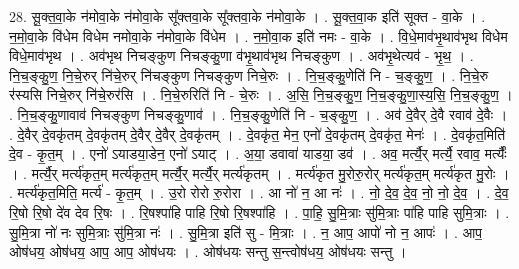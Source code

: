 \documentclass[17pt]{extarticle}
\begin{document}
28. सू॒क्त॒वा॒के न॑मोवा॒के न॑मोवा॒के सू᳚क्तवा॒के सू᳚क्तवा॒के न॑मोवा॒के । . सू॒क्त॒वा॒क इति॑ सूक्त - वा॒के । . न॒मो॒वा॒के वि॑धेम विधेम नमोवा॒के न॑मोवा॒के वि॑धेम । . न॒मो॒वा॒क इति॑ नमः - वा॒के । . वि॒धे॒माव॑भृ॒थाव॑भृथ विधेम विधे॒माव॑भृथ । . अव॑भृथ निचङ्कुण निचङ्कु॒णा व॑भृ॒थाव॑भृथ निचङ्कुण । . अव॑भृ॒थेत्यव॑ - भृ॒थ॒ । . नि॒च॒ङ्कु॒ण॒ नि॒चे॒रुर् नि॑चे॒रुर् नि॑चङ्कुण निचङ्कुण निचे॒रुः । . नि॒च॒ङ्कु॒णेति॑ नि - च॒ङ्कु॒ण॒ । . नि॒चे॒रु र॑स्यसि निचे॒रुर् नि॑चे॒रुर॑सि । . नि॒चे॒रुरिति॑ नि - चे॒रुः । . अ॒सि॒ नि॒च॒ङ्कु॒ण॒ नि॒च॒ङ्कु॒णा॒स्य॒सि॒ नि॒च॒ङ्कु॒ण॒ । . नि॒च॒ङ्कु॒णावाव॑ निचङ्कुण निचङ्कु॒णाव॑ । . नि॒च॒ङ्कु॒णेति॑ नि - च॒ङ्कु॒ण॒ । . अव॑ दे॒वैर् दे॒वै रवाव॑ दे॒वैः । . दे॒वैर् दे॒वकृ॑तम् दे॒वकृ॑तम् दे॒वैर् दे॒वैर् दे॒वकृ॑तम् । . दे॒वकृ॑त॒ मेन॒ एनो॑ दे॒वकृ॑तम् दे॒वकृ॑त॒ मेनः॑ । . दे॒वकृ॑त॒मिति॑ दे॒व - कृ॒त॒म् । . एनो॑ ऽयाडया॒डेन॒ एनो॑ ऽयाट् । . अ॒या॒ डवावा॑ याडया॒ डव॑ । . अव॒ मर्त्यै॒र् मर्त्यै॒ रवाव॒ मर्त्यैः᳚ । . मर्त्यै॒र् मर्त्य॑कृत॒म् मर्त्य॑कृत॒म् मर्त्यै॒र् मर्त्यै॒र् मर्त्य॑कृतम् । . मर्त्य॑कृत मु॒रोरु॒रोर् मर्त्य॑कृत॒म् मर्त्य॑कृत मु॒रोः । . मर्त्य॑कृत॒मिति॒ मर्त्य॑ - कृ॒त॒म् । . उ॒रो रोरो रु॒रोरा । . आ नो॑ न॒ आ नः॑ । . नो॒ दे॒व॒ दे॒व॒ नो॒ नो॒ दे॒व॒ । . दे॒व॒ रि॒षो रि॒षो दे॑व देव रि॒षः । . रि॒षश्पा॑हि पाहि रि॒षो रि॒षश्पा॑हि । . पा॒हि॒ सु॒मि॒त्राः सु॑मि॒त्राः पा॑हि पाहि सुमि॒त्राः । . सु॒मि॒त्रा नो॑ नः सुमि॒त्राः सु॑मि॒त्रा नः॑ । . सु॒मि॒त्रा इति॑ सु - मि॒त्राः । . न॒ आप॒ आपो॑ नो न॒ आपः॑ । . आप॒ ओष॑धय॒ ओष॑धय॒ आप॒ आप॒ ओष॑धयः । . ओष॑धयः सन्तु स॒न्त्वोष॑धय॒ ओष॑धयः सन्तु । \newline
\end{document}
